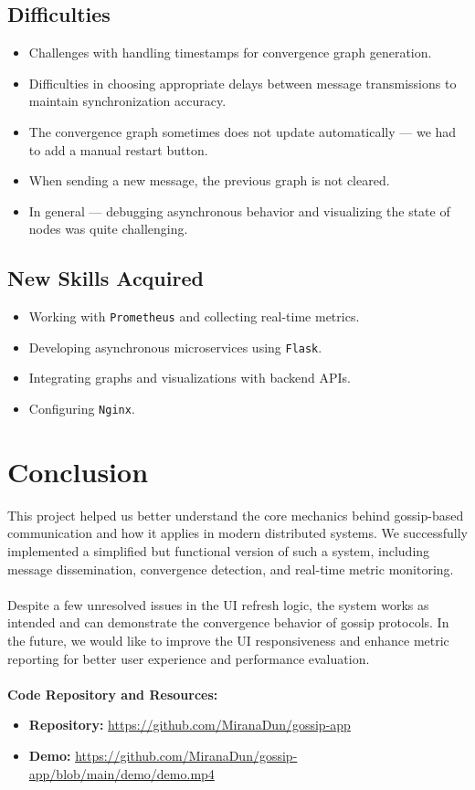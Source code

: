 \documentclass[a4paper,12pt]{article}
\begin{document}
\subsection*{Difficulties}
\begin{itemize}
    \item Challenges with handling timestamps for convergence graph generation.
    \item Difficulties in choosing appropriate delays between message transmissions to maintain synchronization accuracy.
    \item The convergence graph sometimes does not update automatically — we had to add a manual restart button.
    \item When sending a new message, the previous graph is not cleared.
    \item In general — debugging asynchronous behavior and visualizing the state of nodes was quite challenging.
\end{itemize}

\subsection*{New Skills Acquired}
\begin{itemize}
    \item Working with \verb|Prometheus| and collecting real-time metrics.
    \item Developing asynchronous microservices using \verb|Flask|.
    \item Integrating graphs and visualizations with backend APIs.
    \item Configuring \verb|Nginx|.
\end{itemize}

\section{Conclusion}

This project helped us better understand the core mechanics behind gossip-based communication and how it applies in modern distributed systems. We successfully implemented a simplified but functional version of such a system, including message dissemination, convergence detection, and real-time metric monitoring.\\\\
Despite a few unresolved issues in the UI refresh logic, the system works as intended and can demonstrate the convergence behavior of gossip protocols. In the future, we would like to improve the UI responsiveness and enhance metric reporting for better user experience and performance evaluation.\\\\
\textbf{Code Repository and Resources:}
\begin{itemize}
    \item \textbf{Repository:} \url{https://github.com/MiranaDun/gossip-app}
    \item \textbf{Demo:} \url{https://github.com/MiranaDun/gossip-app/blob/main/demo/demo.mp4}
\end{itemize}
\end{document}
